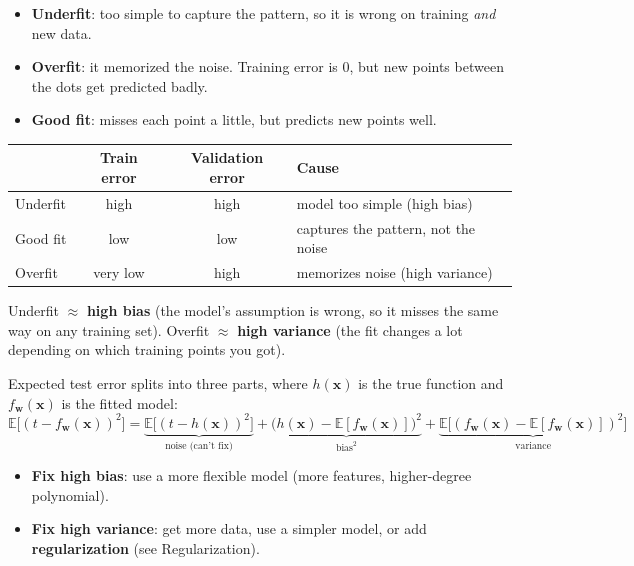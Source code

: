 \begin{keeptogether}
\begin{itemize}
  \item \textbf{Underfit}: too simple to capture the pattern, so it is wrong on training \emph{and} new data.
  \item \textbf{Overfit}: it memorized the noise. Training error is 0, but new points between the dots get predicted badly.
  \item \textbf{Good fit}: misses each point a little, but predicts new points well.
\end{itemize}

\begin{center}
\begin{tabular}{lccl}
\toprule
 & Train error & Validation error & Cause \\
\midrule
Underfit & high & high & model too simple (high bias) \\
Good fit & low & low & captures the pattern, not the noise \\
Overfit & very low & high & memorizes noise (high variance) \\
\bottomrule
\end{tabular}
\end{center}
\end{keeptogether}

Underfit $\approx$ \textbf{high bias} (the model's assumption is wrong, so it misses the same way on any training set). Overfit $\approx$ \textbf{high variance} (the fit changes a lot depending on which training points you got).

\begin{keeptogether}
Expected test error splits into three parts, where $h(\mathbf{x})$ is the true function and $f_{\mathbf{w}}(\mathbf{x})$ is the fitted model:
\[
\mathbb{E}\big[(t - f_{\mathbf{w}}(\mathbf{x}))^2\big]
= \underbrace{\mathbb{E}\big[(t - h(\mathbf{x}))^2\big]}_{\text{noise (can't fix)}}
+ \underbrace{\big(h(\mathbf{x}) - \mathbb{E}[f_{\mathbf{w}}(\mathbf{x})]\big)^2}_{\text{bias}^2}
+ \underbrace{\mathbb{E}\big[(f_{\mathbf{w}}(\mathbf{x}) - \mathbb{E}[f_{\mathbf{w}}(\mathbf{x})])^2\big]}_{\text{variance}}
\]
\begin{itemize}
  \item \textbf{Fix high bias}: use a more flexible model (more features, higher-degree polynomial).
  \item \textbf{Fix high variance}: get more data, use a simpler model, or add \textbf{regularization} (see Regularization).
\end{itemize}
\end{keeptogether}